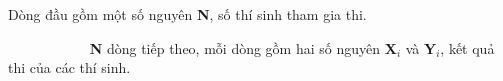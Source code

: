 Dòng đầu gồm một số nguyên \textbf{N}, số thí sinh tham gia thi.

            \textbf{N} dòng tiếp theo, mỗi dòng gồm hai số nguyên \textbf{X$_i$} và \textbf{Y$_i$}, kết quả thi của các thí sinh.